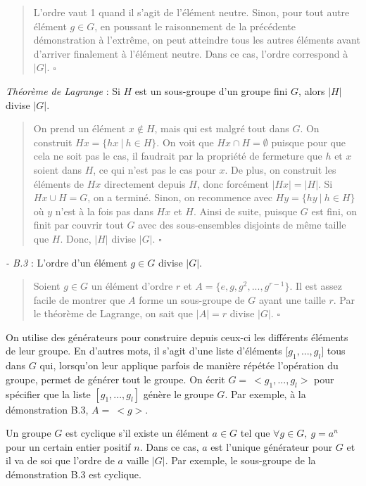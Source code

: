\begin{quote}
    L'ordre vaut 1 quand il s'agit de l'élément neutre. Sinon, pour tout autre élément $g \in G$, en poussant le raisonnement de la précédente démonstration à l'extrême, on peut atteindre tous les autres éléments avant d'arriver finalement à l'élément neutre. Dans ce cas, l'ordre correspond à $|G|$. $\square$
\end{quote}

\textit{Théorème de Lagrange} : Si $H$ est un sous-groupe d'un groupe fini $G$, alors $|H|$ divise $|G|$.

\begin{quote}
    On prend un élément $x \not\in H$, mais qui est malgré tout dans $G$. On construit $Hx = \{hx \ | \ h \in H \}$. On voit que $Hx \cap H = \emptyset$ puisque pour que cela ne soit pas le cas, il faudrait par la propriété de fermeture que $h$ et $x$ soient dans $H$, ce qui n'est pas le cas pour $x$. De plus, on construit les éléments de $Hx$ directement depuis $H$, donc forcément $|Hx| = |H|$. Si $Hx \cup H = G$, on a terminé. Sinon, on recommence avec $Hy = \{hy \ | \ h \in H\}$ où $y$ n'est à la fois pas dans $Hx$ et $H$. Ainsi de suite, puisque $G$ est fini, on finit par couvrir tout $G$ avec des sous-ensembles disjoints de même taille que $H$. Donc, $|H|$ divise $|G|$. $\square$ 
\end{quote}

\textit{- B.3} : L'ordre d'un élément $g \in G$ divise $|G|$.

\begin{quote}
    Soient $g \in G$ un élément d'ordre $r$ et $A = \{e, g, g^2, ..., g^{r-1}\}$. Il est assez facile de montrer que $A$ forme un sous-groupe de $G$ ayant une taille $r$. Par le théorème de Lagrange, on sait que $|A| = r$ divise $|G|$. $\square$ 
\end{quote}

On utilise des générateurs pour construire depuis ceux-ci les différents éléments de leur groupe. En d'autres mots, il s'agit d'une liste d'éléments [$g_1, ..., g_l]$ tous dans $G$ qui, lorsqu'on leur applique parfois de manière répétée l'opération du groupe, permet de générer tout le groupe. On écrit $G = \ <g_1, ..., g_l>$ pour spécifier que la liste $[g_1, ..., g_l]$ génère le groupe $G$. Par exemple, à la démonstration B.3, $A =  \ <g>$.

Un groupe $G$ est cyclique s'il existe un élément $a \in G$ tel que $ \forall g \in G, \ g = a^n$ pour un certain entier positif $n$. Dans ce cas, $a$ est l'unique générateur pour $G$ et il va de soi que l'ordre de $a$ vaille $|G|$. Par exemple, le sous-groupe de la démonstration B.3 est cyclique.

